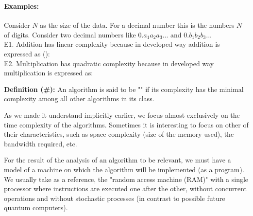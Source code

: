 	\begin{tcolorbox}[colframe=black,colback=white,sharp corners]
\textbf{{\Large {}}Examples:}\\\\
Consider $N$ as the size of the data. For a decimal number this is the numbers $N$ of digits. Consider two decimal numbers like $0.a_1a_2a_3...$ and $0.b_1b_2b_3...$\\

E1. Addition has linear complexity because in developed way addition is expressed as ():\\
	

E2. Multiplication has quadratic complexity because in developed way multiplication is expressed as:\\
	
	\end{tcolorbox}

\textbf{Definition (\#\mydef):} An algorithm is said to be "" if its complexity has the minimal complexity among all other algorithms in its class.

As we made it understand implicitly earlier, we focus almost exclusively on the time complexity of the algorithms. Sometimes it is interesting to focus on other of their characteristics, such as space complexity (size of the memory used), the bandwidth required, etc.

For the result of the analysis of an algorithm to be relevant, we must have a model of a machine on which the algorithm will be implemented (as a program). We usually take as a reference, the "random access machine (RAM)" with a single processor where instructions are executed one after the other, without concurrent operations and without stochastic processes (in contrast to possible future quantum computers).

